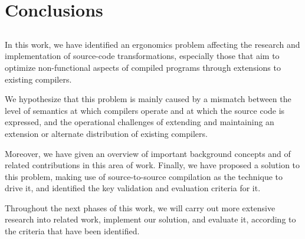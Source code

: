 \chapter{Conclusions} \label{chap:concl}

\section*{}

In this work, we have identified an ergonomics problem affecting the research and implementation of source-code transformations, especially those that aim to optimize non-functional aspects of compiled programs through extensions to existing compilers.

We hypothesize that this problem is mainly caused by a mismatch between the level of semantics at which compilers operate and at which the source code is expressed, and the operational challenges of extending and maintaining an extension or alternate distribution of existing compilers.

Moreover, we have given an overview of important background concepts and of related contributions in this area of work. Finally, we have proposed a solution to this problem, making use of source-to-source compilation as the technique to drive it, and identified the key validation and evaluation criteria for it.

Throughout the next phases of this work, we will carry out more extensive research into related work, implement our solution, and evaluate it, according to the criteria that have been identified.
